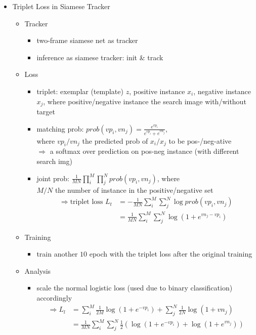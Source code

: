 \begin{itemize}
\item Triplet Loss in Siamese Tracker
	\begin{itemize}
	\item Tracker
		\begin{itemize}
		\item two-frame siamese net as tracker
		\item inference as siamese tracker: init \& track
		\end{itemize}
	\item Loss
		\begin{itemize}
		\item triplet: exemplar (template) $z$, positive instance $x_i$, negative instance $x_j$,
		where positive/negative instance the search image with/without target
		\item matching prob: $\displaystyle prob(vp_i, vn_j)=\frac{e^{vp_i}}{e^{vp_i} + e^{vn_j}}$, \\
		where $vp_i / vn_j$ the predicted prob of $x_i/x_j$ to be pos-/neg-ative \\
		$\Rightarrow$ a softmax over prediction on pos-neg instance (with different search img)
		\item joint prob: $\displaystyle \frac {1}{MN} \prod_{i}^M\prod_j^N prob(vp_i, vn_j)$, where \\
		$M/N$ the number of instance in the positive/negative set
		\begin{align*} \Rightarrow \text{triplet loss } \displaystyle L_t &= - \frac 1 {MN} \sum_{i}^M\sum_{j}^N\log prob(vp_i, vn_j) \\
		&= \frac 1 {MN} \sum_{i}^M\sum_{j}^N \log(1+e^{vn_j-vp_i}) 
		\end{align*}
		\end{itemize}
	\item Training
		\begin{itemize}
		\item train another $10$ epoch with the triplet loss after the original training
		\end{itemize}
	\item Analysis
		\begin{itemize}
		\item scale the normal logistic loss (used due to binary classification) accordingly \\
		\begin{align*}
		\Rightarrow \displaystyle L_l &= \sum_i^M \frac 1 {2M}\log(1+e^{-vp_i}) + \sum_{j}^N \frac 1 {2N}\log(1+vn_j) \\
		&= \frac 1 {MN} \sum_i^M\sum_j^N \frac 1 2 (\log(1+e^{-vp_i}) + \log(1+e^{vn_j}))

\end{align*}
\end{itemize}
\end{itemize}
\end{itemize}
